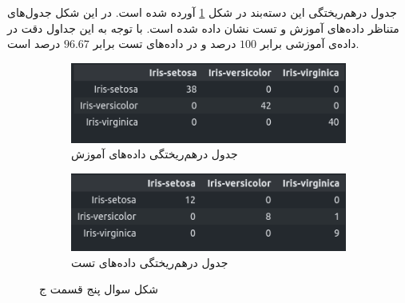 \documentclass{article}
\begin{document}
جدول درهم‌ریختگی این دسته‌بند در شکل \ref{implementation-question1-partb} آورده شده است. در این شکل جدول‌های متناظر
داده‌های آموزش و تست نشان داده شده است. با توجه به این جداول دقت در داده‌ی آموزشی
برابر $100$ درصد و در داده‌های تست برابر $96.67$ درصد است.

\begin{figure}[h]
    \begin{subfigure}{0.48\linewidth}
        \includegraphics[width=\linewidth]{images/implementation/q1/train_confusion_matrix.png}
        \caption{جدول درهم‌ریختگی داده‌های آموزش}
    \end{subfigure}
    \hfill
    \begin{subfigure}{0.48\linewidth}
        \includegraphics[width=\linewidth]{images/implementation/q1/test_confusion_matrix.png}
        \caption{جدول درهم‌ریختگی داده‌های تست}
    \end{subfigure}
    \caption{شکل سوال پنج قسمت ج}
    \label{implementation-question1-partb}
\end{figure}
\end{document}
